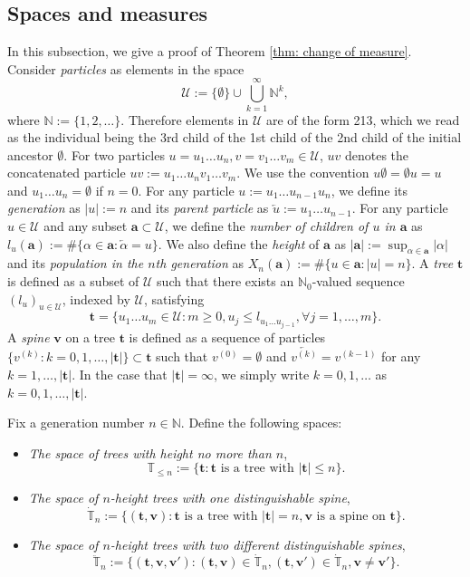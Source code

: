 \documentclass[12pt,a4paper]{amsart}
\numberwithin{equation}{section}
\begin{document}
\subsection{Spaces and measures}
\label{sec:spacesandmeasures}
	In this subsection, we give a proof of Theorem \ref{thm: change of measure}.
 	Consider \emph{particles} as elements in the space
\[
		\mathcal U
	:=
	\{\emptyset\}\cup\bigcup_{k=1}^\infty \mathbb N^k,
\]
	where $\mathbb N:=\{1,2,\dots\}$.
	Therefore elements in $\mathcal U$ are of the form 213, which we read as the individual being the 3rd child of the 1st child of the 2nd child of the initial ancestor $\emptyset$.
	For two particles $u=u_1\dots u_n, v=v_1\dots v_m\in\mathcal U$, $uv$ denotes the concatenated particle $uv:=u_1\dots u_nv_1\dots v_m$.
	We use the convention $u\emptyset = \emptyset u = u$ and $u_1\dots u_n=\emptyset$ if $n=0$.
	For any particle $u:=u_1\dots u_{n-1}u_n$, we define its \emph{generation} as $| u |:=n$ and its \emph{parent particle} as $\overleftarrow{u}:=u_1\dots u_{n-1}$.
	For any particle $u \in \mathcal U$ and any subset $\mathbf a \subset \mathcal U$, we define the \emph{number of children of $u$ in $\mathbf a$} as $l_u(\mathbf a) := \#\{\alpha\in \mathbf a:\overleftarrow{\alpha}=u\} $.
	We also define the \emph{height} of $\mathbf a$ as $|\mathbf a|:=\sup_{\alpha\in \mathbf a}|\alpha|$ and its \emph{population in the $n$th generation} as $X_n(\mathbf a):=\#\{u\in \mathbf a:|u|=n\}$.
	A \emph{tree} $ \mathbf t $ is defined as a subset of $\mathcal U$ such that there exists an $\mathbb N_0$-valued sequence $(l_u)_{u\in \mathcal U}$,
	indexed by $\mathcal U$, satisfying
\[
		 \mathbf t
	=\{u_1\dots u_m\in \mathcal U: m\ge 0, u_j\leq l_{u_1\dots u_{j-1}}, \forall  j=1,\dots,m\}.
\]
	A \emph{spine} $ \mathbf v$ on a  tree $ \mathbf t $ is defined as a sequence of particles $\{v^{(k)}:k=0,1,\dots,| \mathbf t |\}\subset \mathbf t $ such that $v^{(0)}=\emptyset$ and $\overleftarrow{v^{(k)}}=v^{(k-1)}$ for any $k=1,\dots, | \mathbf t |$.
	In the case that $| \mathbf t |=\infty$, we simply write $k=0,1,\dots$ as $k=0,1,\dots, | \mathbf t |$.

	Fix a generation number $n\in \mathbb N$. Define the following spaces:
\begin{itemize}
\item
	\emph{The space of trees with height no more than $n$},
\[
		\mathbb T_{\leq n}
	:=\{ \mathbf t : \mathbf t \text{ is a tree with }| \mathbf t | \leq n\}.
\]
\item
	\emph {The space of $n$-height trees with one distinguishable spine},
\[
		\dot{\mathbb T}_n
	:=\{( \mathbf t , \mathbf v): \mathbf t  \text{ is a tree with } | \mathbf t |=n,  \mathbf v \text{ is a spine on }  \mathbf t \}.
\]
\item
	\emph{The space of $n$-height trees with two different distinguishable spines},
\[
		\ddot{\mathbb T}_n
	:=\{( \mathbf t , \mathbf v, \mathbf v'):( \mathbf t , \mathbf v)\in\dot{\mathbb T}_n,( \mathbf t , \mathbf v')\in\dot{\mathbb T}_n, \mathbf v\neq \mathbf v'\}.
\]
\end{itemize}
\end{document}
